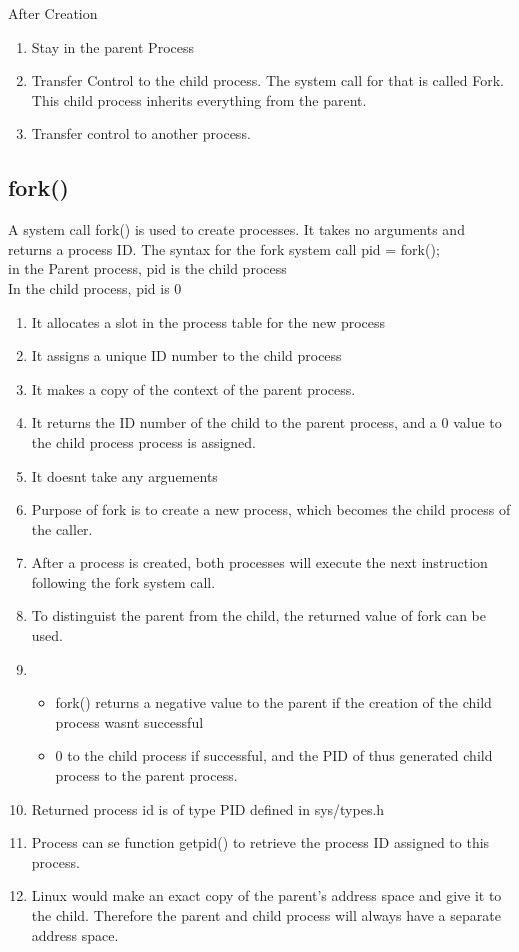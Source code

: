 \documentclass[11pt]{article}
\begin{document}
After Creation
\begin{enumerate}
	\item Stay in the parent Process
	\item Transfer Control to the child process. The system call for that is called Fork. This child process inherits everything from the parent.
	\item Transfer control to another process.
\end{enumerate}


\subsection{fork()}
A system call fork() is used to create processes. It takes no arguments and returns a process ID.
The syntax for the fork system call
pid = fork();\\
in the Parent process, pid is the child process\\
In the child process, pid is 0

\begin{enumerate}
	\item It allocates a slot in the process table for the new process
	\item It assigns a unique ID number to the child process
	\item It makes a copy of the context of the parent process.
	\item It returns the ID number of the child to the parent process, and a 0 value to the child process process is assigned.
	\item It doesnt take any arguements
	\item Purpose of fork is to create a new process, which becomes the child process of the caller.
	\item After a process is created, both processes will execute the next instruction following the fork system call.
	\item To distinguist the parent from the child, the returned value of fork can be used.
	\item \begin{itemize}
		      \item fork() returns a negative value to the parent if the creation of the child process wasnt successful
		      \item 0 to the child process if successful, and the PID of thus generated child process to the parent process.
	      \end{itemize}
	\item Returned process id is of type PID defined in sys/types.h
	\item Process can se function getpid() to retrieve the process ID assigned to this process.
	\item Linux would make an exact copy of the parent's address space and give it to the child. Therefore the parent and child process will always have a separate address space.

\end{enumerate}
\end{document}
